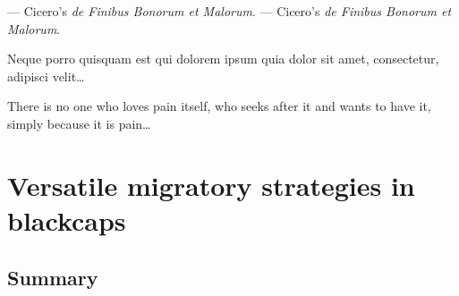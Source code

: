 \documentclass[a4paper, twoside]{templates/ociamthesis}
\begin{document}
--- Cicero's \emph{de Finibus Bonorum et Malorum}. --- Cicero's \emph{de Finibus Bonorum et Malorum}.

\begin{savequote}
Neque porro quisquam est qui dolorem ipsum quia dolor sit amet,
consectetur, adipisci velit\ldots{}

There is no one who loves pain itself, who seeks after it and wants to
have it, simply because it is pain\ldots{}
\end{savequote}

\hypertarget{blackcap-geo}{%
\chapter{Versatile migratory strategies in blackcaps}\label{blackcap-geo}}

\minitoc 

\hypertarget{summary}{%
\section{Summary}\label{summary}}
\end{document}
